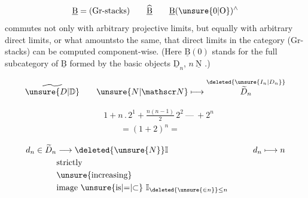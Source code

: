 
\[
\underline{\mathrm B}=(\text{Gr-stacks})\qquad
\widehat{\underline{\mathrm B}}\qquad
\underline{\mathrm B}(\unsure{0|\mathrm O})^{\wedge}
\]
commutes not only with arbitrary projective limits, but equally with arbitrary direct limits, or what amountsto the same, that direct limits in the category (Gr-stacks) can be computed component-wise. (Here \(\underline{\mathrm B}(0)\) stands for the full subcategory of \(\underline{\mathrm B}\) formed by the basic objects \(\underline{\mathrm D}_n\), \(n\ \underline{\mathrm N}\) .)

\[
\widetilde{\unsure{D|\mathbb D}}\qquad
\unsure{N|\mathscr N}\longmapsto
\overset{\deleted{\unsure{I_n|D_n}}}{\widetilde D_n}
\]

\[
\begin{aligned}
&1+n\mathbin{.}2^1+\frac{n(n-1)}{2}\,2^2\ \text{---}\ +2^n\\
&\qquad=(1+2)^n=
\end{aligned}
\]

\[
\begin{aligned}
d_n\in\widetilde D_n&\longrightarrow\deleted{\unsure{N}}\mathbb I
 &\qquad d_n&\longmapsto n\\
&\text{strictly}\\
&\text{\unsure{increasing}}\\
&\text{image \unsure{is|\(=\)|\(\subset\)}}\ \mathbb I_{\deleted{\unsure{\in n}}\leq n}
\end{aligned}
\]


